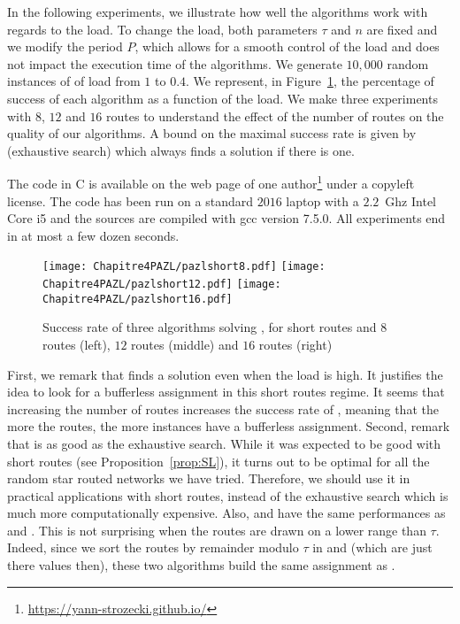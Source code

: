      In the following experiments, we illustrate how well the algorithms work with regards to the load. To change the load, both parameters $\tau$ and $n$ are fixed and we modify the period $P$, which allows for a smooth control of the load and does not impact the execution time of the algorithms.
	   We generate $10,000$ random instances of \pazl of load from $1$ to $0.4$. We represent, in Figure~\ref{fig:short}, the percentage of success of each algorithm as a function of the load. We make three experiments with $8$, $12$ and $16$ routes to understand the effect of the number of routes on the quality of our algorithms. A bound on the maximal success rate is given by \ESCA (exhaustive search) which always finds a solution if there is one. 

     The code in C is available on the web page of one author\footnote{\url{https://yann-strozecki.github.io/}} under a copyleft license. The code has been run on a standard $2016$ laptop with a $2.2$~Ghz Intel Core i5 and the sources are compiled with gcc version 7.5.0. All experiments end in at most a few dozen seconds.



      \begin{figure}[h]
      \begin{center}
   \texttt{[image: Chapitre4PAZL/pazlshort8.pdf]}
   \texttt{[image: Chapitre4PAZL/pazlshort12.pdf]}
   \texttt{[image: Chapitre4PAZL/pazlshort16.pdf]}
      \end{center}
      \caption{Success rate of three algorithms solving \pazl, for short routes and $8$ routes (left), $12$ routes (middle) and $16$ routes (right)}\label{fig:short}
      \end{figure}

      First, we remark that \ESCA finds a solution even when the load is high. It justifies the idea to look for a bufferless assignment in this short routes regime. It seems that increasing the number of routes increases the success rate of \ESCA, meaning that the more the routes, the more instances have a bufferless assignment. 
      Second, remark that \shortestlongest is as good as the exhaustive search. While it was expected to be good with short routes (see Proposition~\ref{prop:SL}), it turns out to be optimal for all the random star routed networks we have tried. Therefore, we should use it in practical applications with short routes, instead of the exhaustive search which is much more computationally expensive. 
      Also, \compactpair and \compactfit have the same performances as \ESCA and \shortestlongest. This is not surprising when the routes are drawn on a lower range than $\tau$. Indeed, since we sort the routes by remainder modulo $\tau$  in \compactpair and \compactfit (which are just there values then), these two algorithms build the same assignment as \shortestlongest.

